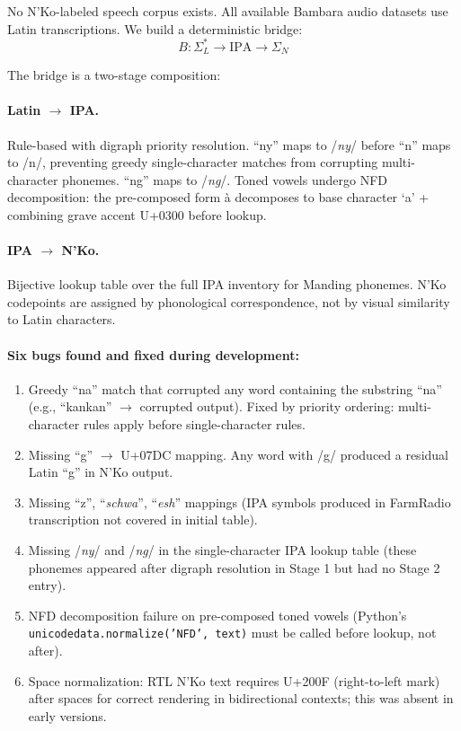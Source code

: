 \documentclass[11pt]{article}
\begin{document}
No N'Ko-labeled speech corpus exists.
All available Bambara audio datasets use Latin transcriptions.
We build a deterministic bridge:
\begin{equation}
B: \Sigma_L^* \to \text{IPA} \to \Sigma_N
\end{equation}

The bridge is a two-stage composition:

\paragraph{Latin $\to$ IPA.}
Rule-based with digraph priority resolution.
``ny'' maps to /\textit{ny}/ before ``n'' maps to /n/, preventing greedy single-character matches from corrupting multi-character phonemes.
``ng'' maps to /\textit{ng}/.
Toned vowels undergo NFD decomposition: the pre-composed form \`{a} decomposes to base character `a' + combining grave accent U+0300 before lookup.

\paragraph{IPA $\to$ N'Ko.}
Bijective lookup table over the full IPA inventory for Manding phonemes.
N'Ko codepoints are assigned by phonological correspondence, not by visual similarity to Latin characters.

\paragraph{Six bugs found and fixed during development:}

\begin{enumerate}
\item Greedy ``na'' match that corrupted any word containing the substring ``na'' (e.g., ``kankan'' $\to$ corrupted output). Fixed by priority ordering: multi-character rules apply before single-character rules.
\item Missing ``g'' $\to$ U+07DC mapping. Any word with /g/ produced a residual Latin ``g'' in N'Ko output.
\item Missing ``z'', ``\textit{schwa}'', ``\textit{esh}'' mappings (IPA symbols produced in FarmRadio transcription not covered in initial table).
\item Missing /\textit{ny}/ and /\textit{ng}/ in the single-character IPA lookup table (these phonemes appeared after digraph resolution in Stage 1 but had no Stage 2 entry).
\item NFD decomposition failure on pre-composed toned vowels (Python's \texttt{unicodedata.normalize('NFD', text)} must be called before lookup, not after).
\item Space normalization: RTL N'Ko text requires U+200F (right-to-left mark) after spaces for correct rendering in bidirectional contexts; this was absent in early versions.
\end{enumerate}
\end{document}
